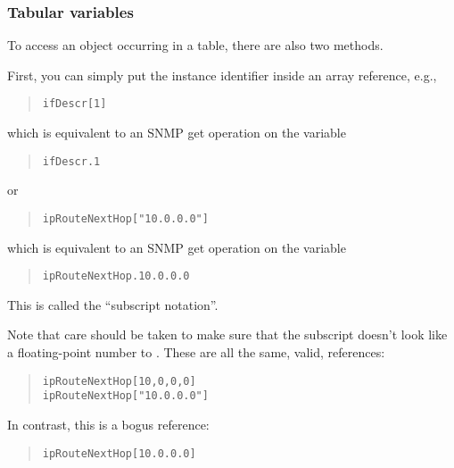 \subsubsection*	{Tabular variables}
To access an object occurring in a table,
there are also two methods.

First,
you can simply put the instance identifier inside an array reference,
e.g.,
\begin{quote}\small\begin{verbatim}
ifDescr[1]
\end{verbatim}\end{quote}
which is equivalent to an SNMP get operation on the variable
\begin{quote}\small\begin{verbatim}
ifDescr.1
\end{verbatim}\end{quote}
or
\begin{quote}\small\begin{verbatim}
ipRouteNextHop["10.0.0.0"]
\end{verbatim}\end{quote}
which is equivalent to an SNMP get operation on the variable
\begin{quote}\small\begin{verbatim}
ipRouteNextHop.10.0.0.0
\end{verbatim}\end{quote}
This is called the ``subscript notation''.

Note that care should be taken to make sure that the subscript doesn't look
like a floating-point number to .
These are all the same, valid, references:
\begin{quote}\small\begin{verbatim}
ipRouteNextHop[10,0,0,0]
ipRouteNextHop["10.0.0.0"]
\end{verbatim}\end{quote}
In contrast,
this is a bogus reference:
\begin{quote}\small\begin{verbatim}
ipRouteNextHop[10.0.0.0]
\end{verbatim}\end{quote}


